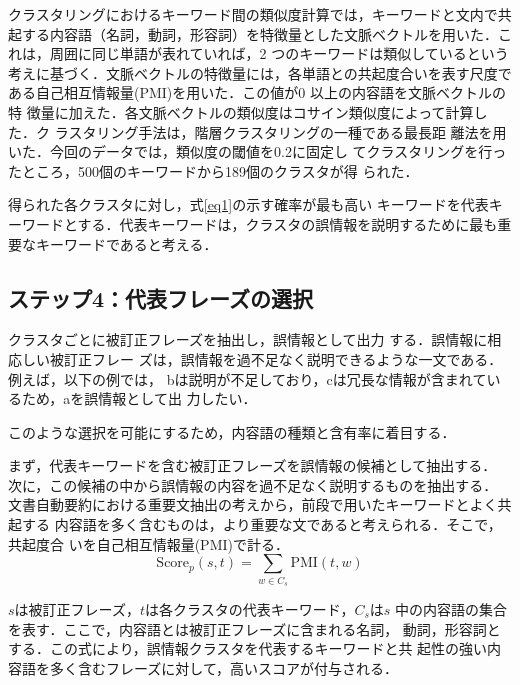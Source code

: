 \documentclass[japanese]{jnlp_1.4}
\newcommand{\EXS}[2]{}
\begin{document}
クラスタリングにおけるキーワード間の類似度計算では，キーワードと文内で共
起する内容語（名詞，動詞，形容詞）を特徴量とした文脈ベクトルを用いた．こ
れは，周囲に同じ単語が表れていれば，2 つのキーワードは類似しているという
考えに基づく．文脈ベクトルの特徴量には，各単語との共起度合いを表す尺度で
ある自己相互情報量(PMI)を用いた．この値が0 以上の内容語を文脈ベクトルの特
徴量に加えた．各文脈ベクトルの類似度はコサイン類似度によって計算した．ク
ラスタリング手法は，階層クラスタリングの一種である最長距
離法を用いた．今回のデータでは，類似度の閾値を0.2に固定し
てクラスタリングを行ったところ，500個のキーワードから189個のクラスタが得
られた．

得られた各クラスタに対し，式\ref{eq1}の示す確率が最も高い
キーワードを代表キーワードとする．代表キーワードは，クラスタの誤情報を説明するために最も重要なキーワードであると考える．


\subsection{ステップ4：代表フレーズの選択}
\label{sec:selecting-representative-phrase}

クラスタごとに被訂正フレーズを抽出し，誤情報として出力
する．誤情報に相応しい被訂正フレー
ズは，誤情報を過不足なく説明できるような一文である．例えば，以下の例では，
bは説明が不足しており，cは冗長な情報が含まれているため，aを誤情報として出
力したい．

\EXS{ex:phrase_selection}{
\item[a] コスモ石油の火災により，有害物質を含む雨が降る
\item[b] コスモ石油の件で，有害な雨が降る
\item[c] コスモ石油が爆発したというのは本当で，有害な雨が降るから
傘やカッパが必須らしい
}
このような選択を可能にするため，内容語の種類と含有率に着目する．

まず，代表キーワードを含む被訂正フレーズを誤情報の候補として抽出する．
次に，この候補の中から誤情報の内容を過不足なく説明するものを抽出する．
文書自動要約における重要文抽出の考えから，前段で用いたキーワードとよく共起する
内容語を多く含むものは，より重要な文であると考えられる．そこで，共起度合
いを自己相互情報量(PMI)で計る．
\begin{equation}
 \mathrm{Score}_{p}(s,t) = \sum_{w \in C_s} \mathrm{PMI}(t,w) \label{eq_scorep}
\end{equation}

$s$は被訂正フレーズ，$t$は各クラスタの代表キーワード，$C_s$は$s$
中の内容語の集合を表す．ここで，内容語とは被訂正フレーズに含まれる名詞，
動詞，形容詞とする．この式により，誤情報クラスタを代表するキーワードと共
起性の強い内容語を多く含むフレーズに対して，高いスコアが付与される．
\end{document}
